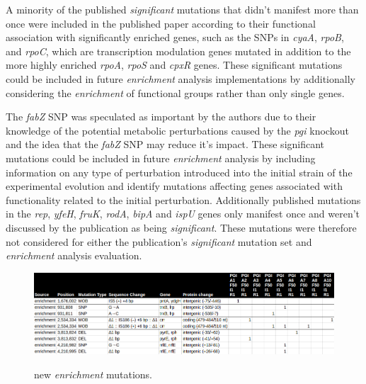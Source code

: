 \documentclass[12pt,final,masters,chapterheads]{ucsd}  %
\begin{document}
A minority of the published \textit{significant} mutations that didn't manifest more than once were included in the published paper according to their functional association with significantly enriched genes, such as the SNPs in \textit{cyaA}, \textit{rpoB}, and \textit{rpoC}, which are transcription modulation genes mutated in addition to the more highly enriched \textit{rpoA}, \textit{rpoS} and \textit{cpxR} genes. These significant mutations could be included in future \textit{enrichment} analysis implementations by additionally considering the \textit{enrichment} of functional groups rather than only single genes.

The \textit{fabZ} SNP was speculated as important by the authors due to their knowledge of the potential metabolic perturbations caused by the \textit{pgi} knockout and the idea that the \textit{fabZ} SNP may reduce it's impact. These significant mutations could be included in future \textit{enrichment} analysis by including information on any type of perturbation introduced into the initial strain of the experimental evolution and identify mutations affecting genes associated with functionality related to the initial perturbation.
Additionally published mutations in the \textit{rep}, \textit{yfeH}, \textit{fruK}, \textit{rodA}, \textit{bipA} and \textit{ispU} genes only manifest once and weren't discussed by the publication as being \textit{significant}. These mutations were therefore not considered for either the publication's \textit{significant} mutation set and \textit{enrichment} analysis evaluation.

\begin{figure}[h!]
  \caption{new \textit{enrichment} mutations.}
  \centering
  \includegraphics[width=\textwidth]{pgi_new_enrichment_mutations.png}
  \label{fig:pgi_new_enrichment_mutations}
\end{figure}
\end{document}
